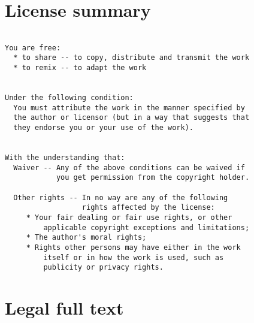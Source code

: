 \section{License summary}

\begin{verbatim}

You are free:
  * to share -- to copy, distribute and transmit the work
  * to remix -- to adapt the work


Under the following condition:
  You must attribute the work in the manner specified by
  the author or licensor (but in a way that suggests that
  they endorse you or your use of the work).


With the understanding that:
  Waiver -- Any of the above conditions can be waived if
            you get permission from the copyright holder.
  
  Other rights -- In no way are any of the following
                  rights affected by the license:
     * Your fair dealing or fair use rights, or other
         applicable copyright exceptions and limitations;
     * The author's moral rights;
     * Rights other persons may have either in the work
         itself or in how the work is used, such as
         publicity or privacy rights.

\end{verbatim}



\section{Legal full text}

